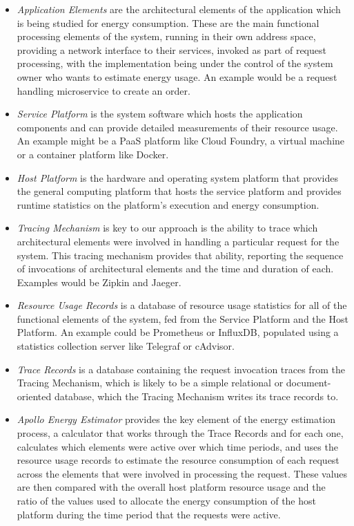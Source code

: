 \begin{itemize}
\item \emph{Application Elements} are the architectural elements of the application which is being studied for energy consumption.  These are the main functional processing elements of the system, running in their own address space, providing a network interface to their services, invoked as part of request processing, with the implementation being under the control of the system owner who wants to estimate energy usage.  An example would be a request handling microservice to create an order.
\item \emph{Service Platform} is the system software which hosts the application components and can provide detailed measurements of their resource usage.  An example might be a PaaS platform like Cloud Foundry, a virtual machine or a container platform like Docker.
\item \emph{Host Platform} is the hardware and operating system platform that provides the general computing platform that hosts the service platform and provides runtime statistics on the platform's execution and energy consumption.
\item \emph{Tracing Mechanism} is key to our approach is the ability to trace which architectural elements were involved in handling a particular request for the system.  This tracing mechanism provides that ability, reporting the sequence of invocations of architectural elements and the time and duration of each.  Examples would be Zipkin and Jaeger.
\item \emph{Resource Usage Records} is a database of resource usage statistics for all of the functional elements of the system, fed from the Service Platform and the Host Platform.  An example could be Prometheus or InfluxDB, populated using a statistics collection server like Telegraf or cAdvisor.
\item \emph{Trace Records} is a database containing the request invocation traces from the Tracing Mechanism, which is likely to be a simple relational or document-oriented database, which the Tracing Mechanism writes its trace records to.
\item \emph{Apollo Energy Estimator} provides the key element of the energy estimation process, a calculator that works through the Trace Records and for each one, calculates which elements were active over which time periods, and uses the resource usage records to estimate the resource consumption of each request across the elements that were involved in processing the request.  These values are then compared with the overall host platform resource usage and the ratio of the values used to allocate the energy consumption of the host platform during the time period that the requests were active.

\end{itemize}

